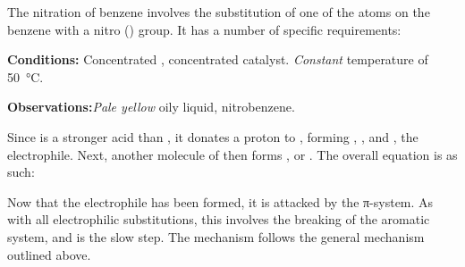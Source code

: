 			The nitration of benzene involves the substitution of one of the  atoms on the benzene with a nitro () group.
			It has a number of specific requirements:

			\vspace{1.5em}
			\vbox{\textbf{Conditions:}	\tabto{35mm}Concentrated , concentrated  catalyst.
										\tabto{35mm}\textit{Constant} temperature of \SI{50}{\celsius}.}\vspace{0.5em}

			\vbox{\textbf{Observations:}\tabto{35mm}\textit{\color{Goldenrod}Pale yellow} oily liquid, nitrobenzene.}


			\vspace{1.0em}

			Since  is a stronger acid than , it donates a proton to , forming , , and , the
			electrophile. Next, another molecule of  then forms , or . The overall equation is as such:



			\pagebreak

			Now that the electrophile  has been formed, it is attacked by the π-system. As with all electrophilic substitutions, this
			involves the breaking of the aromatic system, and is the slow step. The mechanism follows the general mechanism outlined above.





